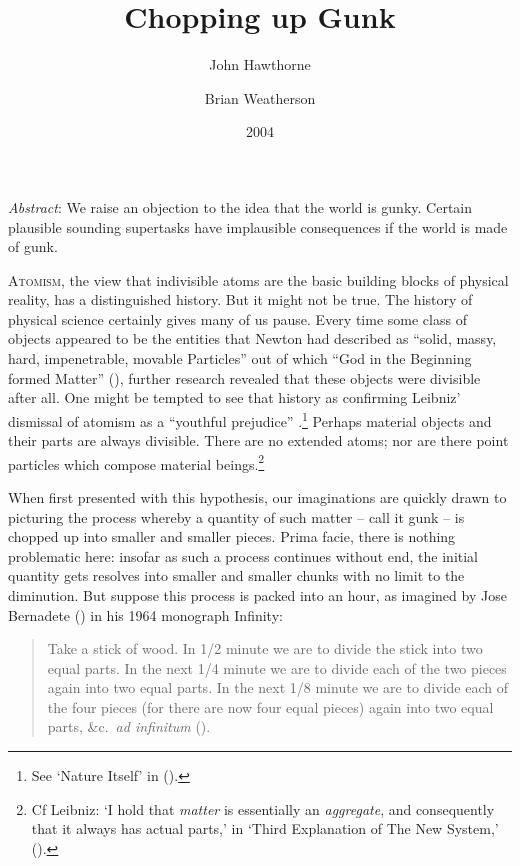 \documentclass[
  11pt,
  letterpaper,
  DIV=11,
  numbers=noendperiod,
  twoside]{scrartcl}
\title{Chopping up Gunk}
\author{John Hawthorne \and Brian Weatherson}
\date{2004}
\renewenvironment{abstract}
 {\vspace{-1.25cm}
 \quotation\small\noindent\emph{Abstract}:}
 {\endquotation}
\renewenvironment{abstract}
 {\quotation\small\noindent\emph{Abstract}:}
 {\endquotation\vspace{-0.02cm}}
\begin{document}
\maketitle
\begin{abstract}
We raise an objection to the idea that the world is gunky. Certain
plausible sounding supertasks have implausible consequences if the world
is made of gunk.
\end{abstract}


\lettrine{A}{tomism}, the view that indivisible atoms are the basic
building blocks of physical reality, has a distinguished history. But it
might not be true. The history of physical science certainly gives many
of us pause. Every time some class of objects appeared to be the
entities that Newton had described as ``solid, massy, hard,
impenetrable, movable Particles'' out of which ``God in the Beginning
formed Matter'' (), further
research revealed that these objects were divisible after all. One might
be tempted to see that history as confirming Leibniz' dismissal of
atomism as a ``youthful prejudice'' .\footnote{See `Nature Itself' in
  ().} Perhaps material
objects and their parts are always divisible. There are no extended
atoms; nor are there point particles which compose material
beings.\footnote{Cf Leibniz: `I hold that \emph{matter} is essentially
  an \emph{aggregate}, and consequently that it always has actual
  parts,' in `Third Explanation of The New System,'
  ().}

When first presented with this hypothesis, our imaginations are quickly
drawn to picturing the process whereby a quantity of such matter -- call
it gunk -- is chopped up into smaller and smaller pieces. Prima facie,
there is nothing problematic here: insofar as such a process continues
without end, the initial quantity gets resolves into smaller and smaller
chunks with no limit to the diminution. But suppose this process is
packed into an hour, as imagined by Jose Bernadete
() in his 1964 monograph Infinity:

\begin{quote}
Take a stick of wood. In 1/2 minute we are to divide the stick into two
equal parts. In the next 1/4 minute we are to divide each of the two
pieces again into two equal parts. In the next 1/8 minute we are to
divide each of the four pieces (for there are now four equal pieces)
again into two equal parts, \&c.~\emph{ad infinitum}
().
\end{quote}
\end{document}
